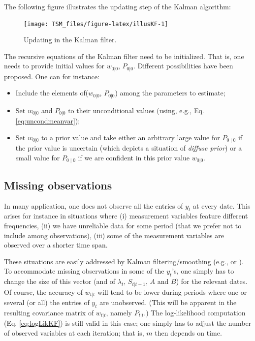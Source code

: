 \documentclass[
  12pt,
]{book}
\providecommand{\tightlist}{%
  \setlength{\itemsep}{0pt}\setlength{\parskip}{0pt}}
\theoremstyle{definition}
\theoremstyle{definition}
\theoremstyle{definition}
\theoremstyle{definition}
\theoremstyle{remark}
\begin{document}
The following figure illustrates the updating step of the Kalman algorithm:

\begin{figure}
\texttt{[image: TSM\_files/figure-latex/illusKF-1]} \caption{Updating in the Kalman filter.}\label{fig:illusKF}
\end{figure}

The recursive equations of the Kalman filter need to be initialized. That is, one needs to provide initial values for \(w_{0|0}\), \(P_{0|0}\). Different possibilities have been proposed. One can for instance:

\begin{itemize}
\tightlist
\item
  Include the elements of(\(w_{0|0}\), \(P_{0|0}\)) among the parameters to estimate;
\item
  Set \(w_{0|0}\) and \(P_{0|0}\) to their unconditional values (using, e.g., Eq. \eqref{eq:uncondmeanvar});
\item
  Set \(w_{0|0}\) to a prior value and take either an arbitrary large value for \(P_{0\mid0}\) if the prior value is uncertain (which depicts a situation of \emph{diffuse prior}) or a small value for \(P_{0\mid0}\) if we are confident in this prior value \(w_{0|0}\).
\end{itemize}

\hypertarget{missing-observations}{%
\subsection{Missing observations}\label{missing-observations}}

In many application, one does not observe all the entries of \(y_t\) at every date. This arises for instance in situations where (i) measurement variables feature different frequencies, (ii) we have unreliable data for some period (that we prefer not to include among observations), (iii) some of the measurement variables are observed over a shorter time span.

These situations are easily addressed by Kalman filtering/smoothing (e.g., \citet{Chow_Lin_1971} or \citet{Harvey_Pierse_1984}). To accommodate missing observations in some of the \(y_t\)'s, one simply has to change the size of this vector (and of \(\lambda_t\), \(S_{t|t-1}\), \(A\) and \(B\)) for the relevant dates. Of course, the accuracy of \(w_{t|t}\) will tend to be lower during periods where one or several (or all) the entries of \(y_t\) are unobserved. (This will be apparent in the resulting covariance matrix of \(w_{t|t}\), namely \(P_{t|t}\).) The log-likelihood computation (Eq. \eqref{eq:logLikKF}) is still valid in this case; one simply has to adjust the number of observed variables at each iteration; that is, \(m\) then depends on time.
\end{document}
